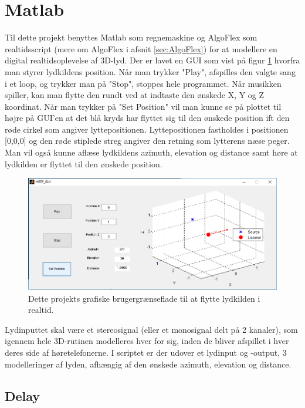 \section{Matlab}

Til dette projekt benyttes Matlab som regnemaskine og AlgoFlex som realtidsscript (mere om AlgoFlex i afsnit \ref{sec:AlgoFlex}) for at modellere en digital realtidsoplevelse af 3D-lyd. Der er lavet en GUI som vist på figur \ref{fig:gui} hvorfra man styrer lydkildens position. Når man trykker "Play", afspilles den valgte sang i et loop, og trykker man på "Stop", stoppes hele programmet. Når musikken spiller, kan man flytte den rundt ved at indtaste den ønskede X, Y og Z koordinat. Når man trykker på "Set Position" vil man kunne se på plottet til højre på GUI'en at det blå kryds har flyttet sig til den ønskede position ift den røde cirkel som angiver lyttepositionen. Lyttepositionen fastholdes i positionen [0,0,0] og den røde stiplede streg angiver den retning som lytterens næse peger. Man vil også kunne aflæse lydkildens azimuth, elevation og distance samt høre at lydkilden er flyttet til den ønskede position. 

\begin{figure}
	\centering
	\includegraphics[width=1\linewidth]{All_Pics/GUI}
	\caption{Dette projekts grafiske brugergrænseflade til at flytte lydkilden i realtid.}
	\label{fig:gui}
\end{figure}


Lydinputtet skal være et stereosignal (eller et monosignal delt på 2 kanaler), som igennem hele 3D-rutinen modelleres hver for sig, inden de bliver afspillet i hver deres side af høretelefonerne. I scriptet er der udover et lydinput og -output, 3 modelleringer af lyden, afhængig af den ønskede azimuth, elevation og distance.

\subsection{Delay}

